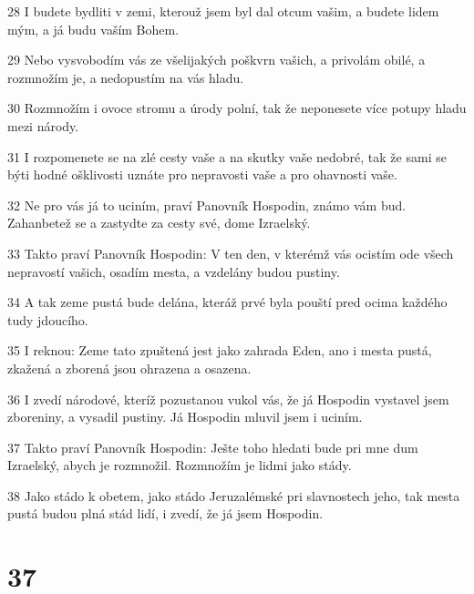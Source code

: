 \par 28 I budete bydliti v zemi, kterouž jsem byl dal otcum vašim, a budete lidem mým, a já budu vaším Bohem.
\par 29 Nebo vysvobodím vás ze všelijakých poškvrn vašich, a privolám obilé, a rozmnožím je, a nedopustím na vás hladu.
\par 30 Rozmnožím i ovoce stromu a úrody polní, tak že neponesete více potupy hladu mezi národy.
\par 31 I rozpomenete se na zlé cesty vaše a na skutky vaše nedobré, tak že sami se býti hodné ošklivosti uznáte pro nepravosti vaše a pro ohavnosti vaše.
\par 32 Ne pro vás já to uciním, praví Panovník Hospodin, známo vám bud. Zahanbetež se a zastydte za cesty své, dome Izraelský.
\par 33 Takto praví Panovník Hospodin: V ten den, v kterémž vás ocistím ode všech nepravostí vašich, osadím mesta, a vzdelány budou pustiny.
\par 34 A tak zeme pustá bude delána, kteráž prvé byla pouští pred ocima každého tudy jdoucího.
\par 35 I reknou: Zeme tato zpuštená jest jako zahrada Eden, ano i mesta pustá, zkažená a zborená jsou ohrazena a osazena.
\par 36 I zvedí národové, kteríž pozustanou vukol vás, že já Hospodin vystavel jsem zboreniny, a vysadil pustiny. Já Hospodin mluvil jsem i uciním.
\par 37 Takto praví Panovník Hospodin: Ješte toho hledati bude pri mne dum Izraelský, abych je rozmnožil. Rozmnožím je lidmi jako stády.
\par 38 Jako stádo k obetem, jako stádo Jeruzalémské pri slavnostech jeho, tak mesta pustá budou plná stád lidí, i zvedí, že já jsem Hospodin.

\chapter{37}

